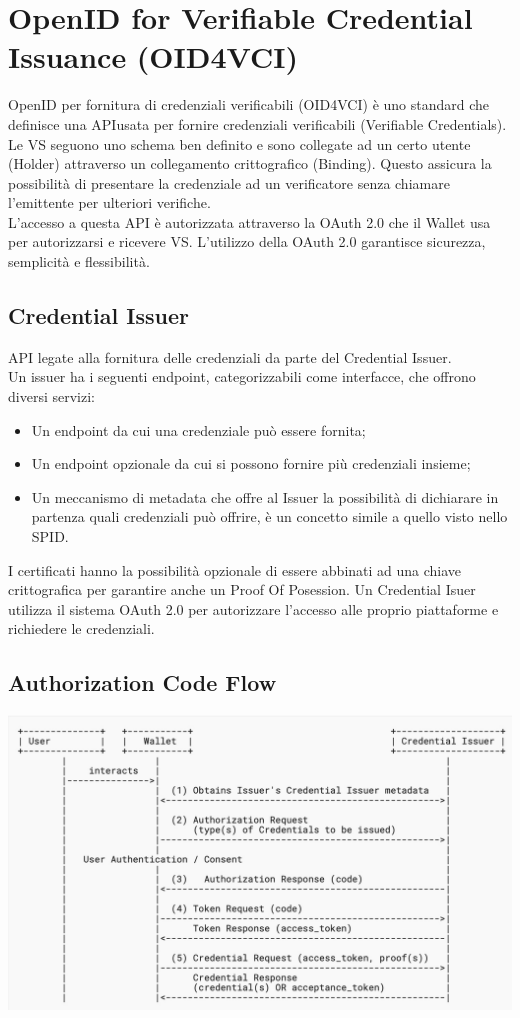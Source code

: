 \section{OpenID for Verifiable Credential Issuance (OID4VCI)}
OpenID per fornitura di credenziali verificabili (OID4VCI) è uno standard che definisce una API\glo usata per fornire credenziali verificabili (Verifiable Credentials).
\\Le VS seguono uno schema ben definito e sono collegate ad un certo utente (Holder) attraverso un collegamento crittografico (Binding). 
Questo assicura la possibilità di presentare la credenziale ad un verificatore senza chiamare l'emittente per ulteriori verifiche.
\\L'accesso a questa API è autorizzata attraverso la OAuth 2.0 che il Wallet usa per autorizzarsi e ricevere VS. L'utilizzo della OAuth 2.0 garantisce sicurezza, semplicità e flessibilità.

\subsection{Credential Issuer}
API legate alla fornitura delle credenziali da parte del Credential Issuer.
\\Un issuer ha i seguenti endpoint, categorizzabili come interfacce, che offrono diversi servizi:
\begin{itemize}
    \item Un endpoint da cui una credenziale può essere fornita;
    \item Un endpoint opzionale da cui si possono fornire più credenziali insieme;
    \item Un meccanismo di metadata che offre al Issuer la possibilità di dichiarare in partenza quali credenziali può offrire, è un concetto simile a quello visto nello SPID.
\end{itemize}
I certificati hanno la possibilità opzionale di essere abbinati ad una chiave crittografica per garantire anche un Proof Of Posession. Un Credential Isuer utilizza il sistema OAuth 2.0 per autorizzare l'accesso alle proprio piattaforme e richiedere le credenziali.

\subsection{Authorization Code Flow}
\begin{center}
	\includegraphics[scale = 0.3]{./res/images/AuthorizationCodeFlow.jpg}
\end{center}

